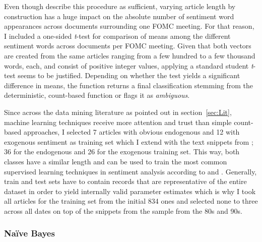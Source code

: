 Even though \textcite{Meyer.2008} describe this procedure as sufficient, varying article length by construction has a huge impact on the absolute number of sentiment word appearances across documents surrounding one FOMC meeting. For that reason, I included a one-sided \textit{t}-test for comparison of means among the different sentiment words across documents per FOMC meeting. Given that both vectors are created from the same articles ranging from a few hundred to a few thousand words, each, and consist of positive integer values, applying a standard student \textit{t}-test seems to be justified. Depending on whether the test yields a significant difference in means, the function returns a final classification stemming from the deterministic, count-based function or flags it as \textit{ambiguous}.

Since across the data mining literature as pointed out in section~\ref{sec:Lit}, machine learning techniques receive more attention and trust than simple count-based approaches, I selected 7 articles with obvious endogenous and 12 with exogenous sentiment as training set which I extend with the text snippets from \textcite{Ellingsen.2003}; 36 for the endogenous and 26 for the exogenous training set. This way, both classes have a similar length and can be used to train the most common supervised learning techniques in sentiment analysis according to \textcite{Liu.2010} and \textcite{Feldman.2013}. Generally, train and test sets have to contain records that are representative of the entire dataset in order to yield internally valid parameter estimates which is why I took all articles for the training set from the initial 834 ones and selected none to three across all dates on top of the snippets from the \textcite{Ellingsen.2003} sample from the 80s and 90s.

\subsubsection{Na\"{i}ve Bayes} %

